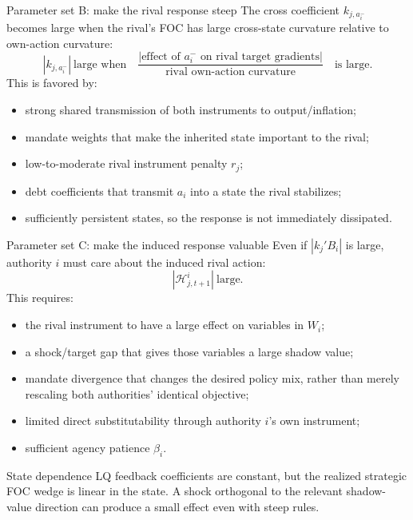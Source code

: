 \documentclass[10pt,aspectratio=169]{beamer}
\begin{document}
\begin{frame}{Parameter set B: make the rival response steep}
The cross coefficient $k_{j,a_i^-}$ becomes large when the rival's FOC has
large cross-state curvature relative to own-action curvature:
\begin{equation*}
|k_{j,a_i^-}|\ \text{large when}\quad
\frac{|\text{effect of }a_i^-\text{ on rival target gradients}|}
{\text{rival own-action curvature}}
\quad\text{is large}.
\end{equation*}
This is favored by:
\begin{itemize}
  \item strong shared transmission of both instruments to output/inflation;
  \item mandate weights that make the inherited state important to the rival;
  \item low-to-moderate rival instrument penalty $r_j$;
  \item debt coefficients that transmit $a_i$ into a state the rival stabilizes;
  \item sufficiently persistent states, so the response is not immediately
        dissipated.
\end{itemize}
\end{frame}

\begin{frame}{Parameter set C: make the induced response valuable}
Even if $|k_j'B_i|$ is large, authority $i$ must care about the induced rival
action:
\begin{equation*}
\boxed{|\mathcal H^i_{j,t+1}|\ \text{large}.}
\end{equation*}
This requires:
\begin{itemize}
  \item the rival instrument to have a large effect on variables in $W_i$;
  \item a shock/target gap that gives those variables a large shadow value;
  \item mandate divergence that changes the desired policy mix, rather than
        merely rescaling both authorities' identical objective;
  \item limited direct substitutability through authority $i$'s own instrument;
  \item sufficient agency patience $\beta_i$.
\end{itemize}
\begin{alertblock}{State dependence}
LQ feedback coefficients are constant, but the realized strategic FOC wedge is
linear in the state. A shock orthogonal to the relevant shadow-value direction
can produce a small effect even with steep rules.
\end{alertblock}
\end{frame}
\end{document}
